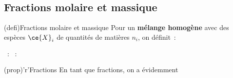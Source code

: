 \documentclass[../../main/main.tex]{subfiles}
\begin{document}
\subsection{Fractions molaire et massique}
\begin{tcbraster}[raster columns=3, raster equal height=rows]

	\begin{tcb}[label=def:fractionsmolmass, raster multicolumn=2](defi){Fractions molaire et massique}
		Pour un \textbf{mélange homogène} avec des espèces $\ce{X}_i$ de quantités
		de matières $n_i$, on définit~:
		\begin{itemize}
			~:
			~:
		\end{itemize}
	\end{tcb}
	\begin{tcb}(prop)'r'{Fractions}
		En tant que fractions, on a évidemment
		\psw{
			\[
				\boxed{\sum x_i = 1 = \sum w_i}
			\]
		}
	\end{tcb}

\end{tcbraster}
\end{document}
